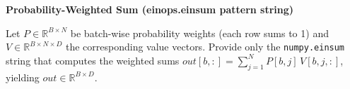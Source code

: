 \item {} \textbf{Probability-Weighted Sum (einops.einsum pattern string)}

Let $P \in \mathbb{R}^{B\times N}$ be batch-wise probability weights (each row sums to 1) and $V \in \mathbb{R}^{B\times N\times D}$ the corresponding value vectors. Provide only the \texttt{numpy.einsum} string that computes the weighted sums $out[b,:] = \sum_{j=1}^N P[b,j]\, V[b,j,:]$, yielding $out \in \mathbb{R}^{B\times D}$.

